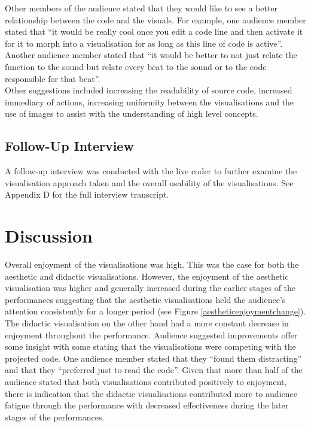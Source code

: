 \documentclass[12pt]{article}
\begin{document}
Other members of the audience stated that they would like to see a better relationship between the code and the visuals. For example, one audience member stated that ``it would be really cool once you edit a code line and then activate it for it to morph into a visualisation for as long as this line of code is active''. Another audience member stated that ``it would be better to not just relate the function to the sound but relate every beat to the sound or to the code responsible for that beat''.\\

Other suggestions included increasing the readability of source code, increased immediacy of actions, increasing uniformity between the visualisations and the use of images to assist with the understanding of high level concepts.\\

\subsection{Follow-Up Interview}

A follow-up interview was conducted with the live coder to further examine the visualisation approach taken and the overall usability of the visualisations. See Appendix D for the full interview transcript.

\section{Discussion}

Overall enjoyment of the visualisations was high. This was the case for both the aesthetic and didactic visualisations. However, the enjoyment of the aesthetic visualisation was higher and generally increased during the earlier stages of the performances suggesting that the aesthetic visualisations held the audience's attention consistently for a longer period (see Figure \ref{aestheticenjoymentchange}).\\

The didactic visualisation on the other hand had a more constant decrease in enjoyment throughout the performance. Audience suggested improvements offer some insight with some stating that the visualisations were competing with the projected code. One audience member stated that they ``found them distracting'' and that they ``preferred just to read the code''. Given that more than half of the audience stated that both visualisations contributed positively to enjoyment, there is indication that the didactic visualisations contributed more to audience fatigue through the performance with decreased effectiveness during the later stages of the performances.\\
\end{document}
